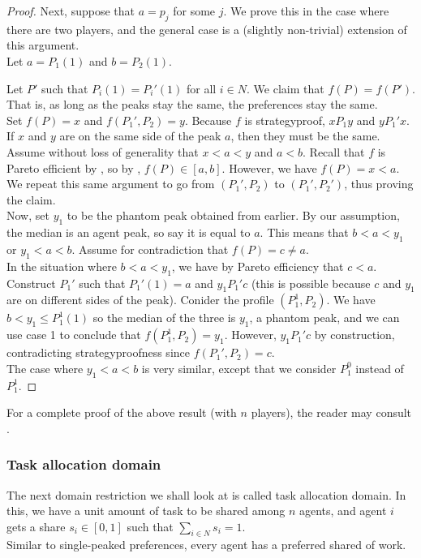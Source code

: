 \begin{proof}
			Next, suppose that $a = p_j$ for some $j$. We prove this in the case where there are two players, and the general case is a (slightly non-trivial) extension of this argument.\\
			Let $a = P_1(1)$ and $b = P_2(1)$. 

			Let $P'$ such that $P_i(1) = P_i'(1)$ for all $i \in N$. We claim that $f(P) = f(P')$. That is, as long as the peaks stay the same, the preferences stay the same.\\
			Set $f(P) = x$ and $f(P_1',P_2) = y$. Because $f$ is strategyproof, $x P_1 y$ and $y P_1' x$. If $x$ and $y$ are on the same side of the peak $a$, then they must be the same.\\
			Assume without loss of generality that $x < a < y$ and $a < b$. Recall that $f$ is Pareto efficient by , so by , $f(P) \in [a,b]$. However, we have $f(P) = x < a$. We repeat this same argument to go from $(P_1',P_2)$ to $(P_1',P_2')$, thus proving the claim.\\
			
			Now, set $y_1$ to be the phantom peak obtained from earlier. By our assumption, the median is an agent peak, so say it is equal to $a$. This means that $b < a < y_1$ or $y_1 < a < b$. Assume for contradiction that $f(P) = c \ne a$.\\
			In the situation where $b < a < y_1$, we have by Pareto efficiency that $c < a$. Construct $P_1'$ such that $P_1'(1) = a$ and $y_1 P_1' c$ (this is possible because $c$ and $y_1$ are on different sides of the peak). Conider the profile $(P_1^1,P_2)$. We have $b < y_1 \le P_1^1(1)$ so the median of the three is $y_1$, a phantom peak, and we can use case 1 to conclude that $f(P_1^1,P_2) = y_1$. However, $y_1 P_1' c$ by construction, contradicting strategyproofness since $f(P_1',P_2) = c$.\\
			The case where $y_1 < a < b$ is very similar, except that we consider $P_1^0$ instead of $P_1^1$.
		\end{proof}

		For a complete proof of the above result (with $n$ players), the reader may consult \cite{moulin-singlepeak}.

	\subsubsection{Task allocation domain}

		The next domain restriction we shall look at is called task allocation domain. In this, we have a unit amount of task to be shared among $n$ agents, and agent $i$ gets a share $s_i \in [0,1]$ such that $\sum_{i \in N} s_i = 1$.\\
		Similar to single-peaked preferences, every agent has a preferred shared of work. 

